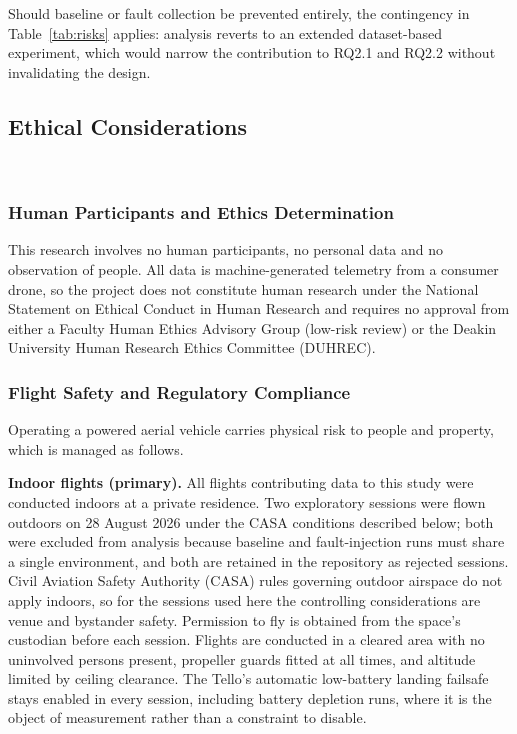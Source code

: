 Should baseline or fault collection be prevented entirely, the contingency in
Table~\ref{tab:risks} applies: analysis reverts to an extended dataset-based
experiment, which would narrow the contribution to RQ2.1 and RQ2.2 without
invalidating the design.

\subsection{Ethical Considerations}~\label{subsec:method-ethics}

\subsubsection{Human Participants and Ethics Determination}

This research involves no human participants, no personal data and no
observation of people. All data is machine-generated telemetry from a consumer
drone, so the project does not constitute human research under the National
Statement on Ethical Conduct in Human Research and requires no approval from
either a Faculty Human Ethics Advisory Group (low-risk review) or the Deakin
University Human Research Ethics Committee (DUHREC).

\subsubsection{Flight Safety and Regulatory Compliance}

Operating a powered aerial vehicle carries physical risk to people and property,
which is managed as follows.

\noindent\textbf{Indoor flights (primary).} All flights contributing data to
this study were conducted indoors at a private residence. Two exploratory
sessions were flown outdoors on 28 August 2026 under the CASA conditions
described below; both were excluded from analysis because baseline and
fault-injection runs must share a single environment, and both are retained in
the repository as rejected sessions. Civil Aviation Safety Authority (CASA)
rules governing outdoor airspace do not apply indoors, so for the sessions used
here the controlling considerations are venue and bystander safety. Permission to fly is obtained from the space's
custodian before each session. Flights are conducted in a cleared area with no
uninvolved persons present, propeller guards fitted at all times, and altitude
limited by ceiling clearance. The Tello's automatic low-battery landing failsafe
stays enabled in every session, including battery depletion runs, where it is the
object of measurement rather than a constraint to disable.

